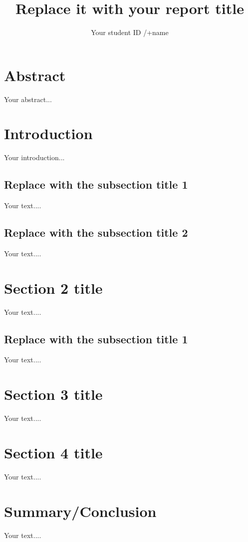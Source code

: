 \documentclass[a4paper]{article}
\begin{document}
\title{Replace it with your report title}
\author{Your student ID /+name}
\date{} %
\maketitle

\section*{Abstract}
Your abstract...


\section{Introduction} \label{intro}
Your introduction...

\subsection{Replace with the subsection title 1} 
Your text....

\subsection{Replace with the subsection title 2} 
Your text....

\section{Section 2 title}
Your text....

\subsection{Replace with the subsection title 1}
Your text....

\section{Section 3 title}
Your text....

\section{Section 4 title}
Your text....

\section{Summary/Conclusion}
Your text....



\end{document}
